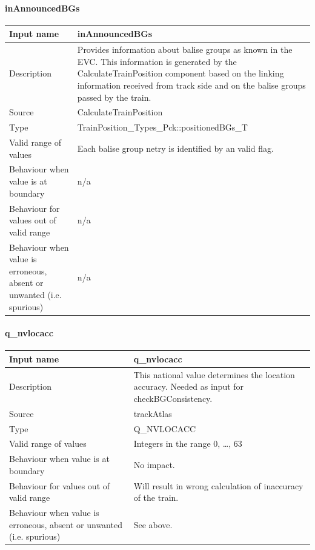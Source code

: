\paragraph{inAnnouncedBGs}

\begin{longtable}{p{}p{}}
\toprule
Input name				& inAnnouncedBGs \\
\midrule
Description				& Provides information about balise groups as known in the EVC. This information is generated by the CalculateTrainPosition component based on the linking information received from track side and on the balise groups passed by the train.\\
\midrule
Source					& CalculateTrainPosition \\ 
\midrule
Type					& TrainPosition\_Types\_Pck::positionedBGs\_T \\
\midrule
Valid range of values	& Each balise group netry is identified by an valid flag. \\
\midrule
Behaviour when value is at boundary	& n/a\\
\midrule
Behaviour for values out of valid range	& n/a\\
\midrule
Behaviour when value is erroneous, absent or unwanted (i.e. spurious) & n/a\\
\bottomrule
\end{longtable}


\paragraph{q\_nvlocacc}

\begin{longtable}{p{}p{}}
\toprule
Input name				& q\_nvlocacc \\
\midrule
Description				& This national value determines the location accuracy. Needed as input for checkBGConsistency.  \\
\midrule
Source					& trackAtlas\\ 
\midrule
Type					& Q\_NVLOCACC \\
\midrule
Valid range of values	& Integers in the range 0, \ldots, 63\\
\midrule
Behaviour when value is at boundary	& No impact.\\
\midrule
Behaviour for values out of valid range	& Will result in wrong calculation of inaccuracy of the train.\\
\midrule
Behaviour when value is erroneous, absent or unwanted (i.e. spurious) & See above.\\
\bottomrule
\end{longtable}


